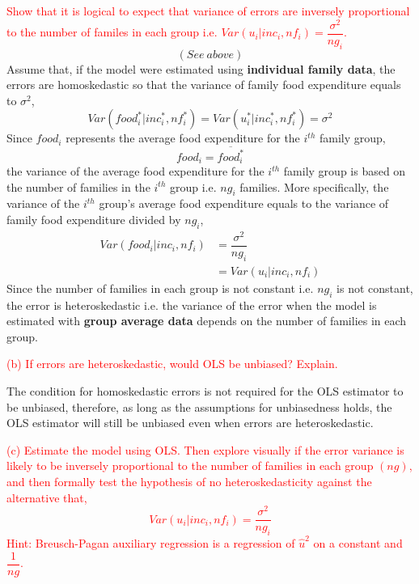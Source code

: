 \documentclass[12pt]{report}
\begin{document}
\noindent \textcolor{red}
{
	Show that it is logical to expect that variance of errors are inversely proportional to the number of familes in each group i.e. $Var(u_i|inc_i,nf_i) = \dfrac{\sigma^2}{ng_i}$.
}
$$(See\ above)$$
\noindent Assume that, if the model were estimated using \textbf{individual family data}, the errors are homoskedastic so that the variance of family food expenditure equals to $\sigma^2$,
$$Var(food^*_i|inc^*_i, nf^*_i) = Var(u^*_i|inc^*_i,nf^*_i) = \sigma^2$$ 
\noindent Since $food_i$ represents the average food expenditure for the $i^{th}$ family group, $$food_i = \overline{food_i^*}$$ the variance of the average food expenditure for the $i^{th}$ family group is based on the number of families in the $i^{th}$ group i.e. $ng_i$ families. More specifically, the variance of the $i^{th}$ group's average food expenditure equals to the variance of family food expenditure divided by $ng_i$,
\begin{align*}
Var(food_i|inc_i,nf_i) &= \dfrac{\sigma^2}{ng_i} \\
&= Var(u_i|inc_i,nf_i)
\end{align*}
\noindent Since the number of families in each group is not constant i.e. $ng_i$ is not constant, the error is heteroskedastic i.e. the variance of the error when the model is estimated with \textbf{group average data} depends on the number of families in each group.

\noindent \textcolor{red}
{
	(b) If errors are heteroskedastic, would OLS be unbiased? Explain.
}

\noindent The condition for homoskedastic errors is not required for the OLS estimator to be unbiased, therefore, as long as the assumptions for unbiasedness holds, the OLS estimator will still be unbiased even when errors are heteroskedastic.


\noindent \textcolor{red}
{
	(c) Estimate the model using OLS. Then explore visually if the error variance is likely to be inversely proportional to the number of families in each group $(ng)$, and then formally test the hypothesis of no heteroskedasticity against the alternative that, $$Var(u_i|inc_i,nf_i)=\dfrac{\sigma^2}{ng_i}$$
	Hint: Breusch-Pagan auxiliary regression is a regression of $\hat{u}^2$ on a constant and $\dfrac{1}{ng}$.
}
\end{document}

